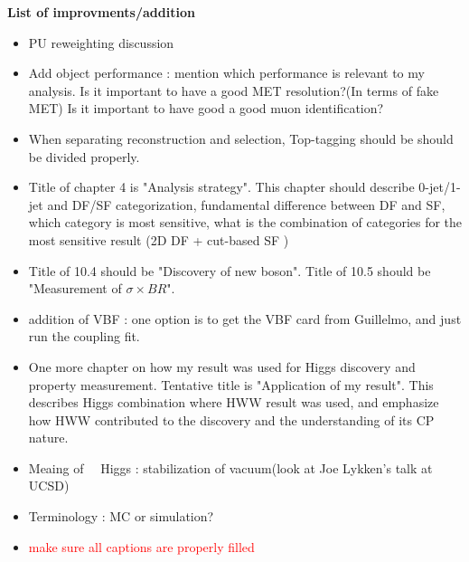 
\begin{center}
\LARGE \textbf{List of improvments/addition}  \\
\end{center}
\vspace{1cm}

\normalsize
\begin{itemize}

\item 
PU reweighting discussion

\item 
Add object performance : mention which performance is relevant to my analysis. 
Is it important to have a good MET resolution?(In terms of fake MET) 
Is it important to have good a good muon identification? 

\item 
When separating reconstruction and selection, Top-tagging should be should be 
divided properly. 

\item 
Title of chapter 4 is "Analysis strategy". This chapter should describe 0-jet/1-jet 
and DF/SF categorization, fundamental difference between DF and SF, which category 
is most sensitive, what is the combination of categories for the most sensitive 
result (2D DF + cut-based SF  )

\item
Title of 10.4 should be "Discovery of new boson". 
Title of 10.5 should be "Measurement of $\sigma \times BR$". 

\item 
addition of VBF : one option is to get the VBF card from Guillelmo, 
and just run the coupling fit. 

\item 
One more chapter on how my result was used for Higgs discovery and property measurement. 
Tentative title is "Application of my result". This describes Higgs combination 
where HWW result was used, and emphasize how HWW contributed to the discovery and 
the understanding of its CP nature. 

\item 
Meaing of ~\GeV\ Higgs : stabilization of vacuum(look at Joe Lykken's talk at UCSD)

\item 
Terminology : MC or simulation?

\item 
\textcolor{red}{make sure all captions are properly filled} 
\end{itemize}
